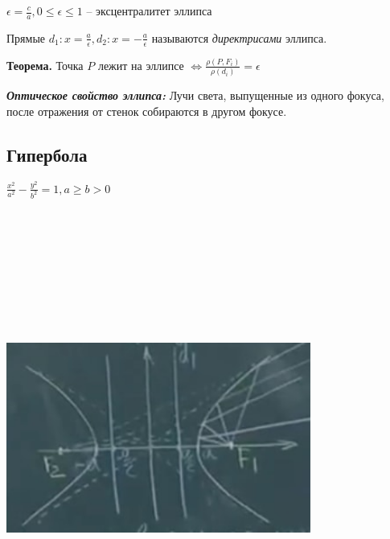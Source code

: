 \vspace{\baselineskip}
$\epsilon = \frac{c}{a}, 0 \leqslant \epsilon \leqslant 1$ -- эксцентралитет эллипса

\vspace{\baselineskip}
Прямые $d_1: x = \frac{a}{\epsilon}, d_2: x = -\frac{a}{\epsilon}$ называются \textit{директрисами} эллипса.

\vspace{\baselineskip}
\textbf{Теорема.} Точка $P$ лежит на эллипсе $\Leftrightarrow \frac{\rho(P, F_i)}{\rho(d_i)} = \epsilon$

\vspace{\baselineskip}
\textbf{\textit{Оптическое свойство эллипса:}} Лучи света, выпущенные из одного фокуса, после отражения от стенок собираются в другом фокусе.

\subsection{Гипербола}

$\frac{x^2}{a^2} - \frac{y^2}{b^2} = 1, a \geqslant b > 0$

\vspace{\baselineskip}
\includegraphics[width=10cm,height=15cm,keepaspectratio]{example4.jpg}

